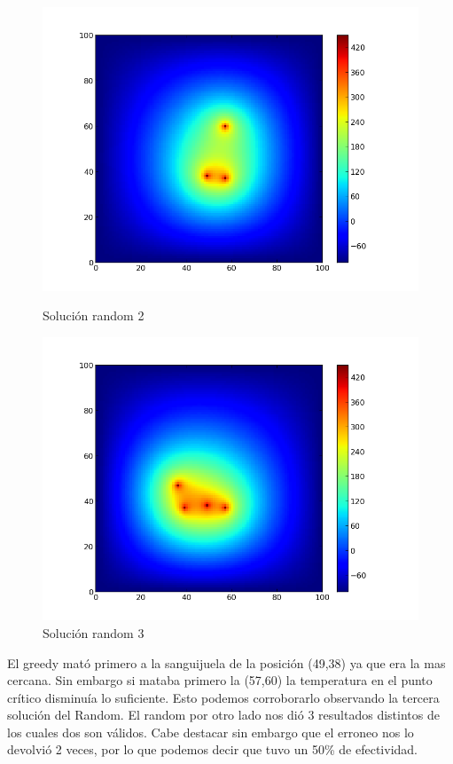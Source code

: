 \begin{figure}[htb]
\begin{center}
\includegraphics[scale=0.40]{imagenes/test6_random_2.png} 
\caption{Solución random 2} 
        \end{center}
\endminipage\hfill 
{}
\begin{center}
\includegraphics[scale=0.40]{imagenes/test6_random_3.png} 
\caption{Solución random 3} 
        \end{center}
\endminipage\hfill 
\end{figure}


El greedy mató primero a la sanguijuela de la posición (49,38) ya que era la mas cercana. Sin embargo si mataba primero la (57,60) la temperatura en el punto crítico disminuía lo suficiente. Esto podemos corroborarlo observando la tercera solución del Random.
El random por otro lado nos dió 3 resultados distintos de los cuales dos son válidos. Cabe destacar sin embargo que el erroneo nos lo devolvió 2 veces, por lo que podemos decir que tuvo un 50\% de efectividad. 


